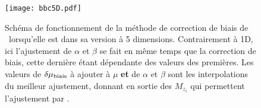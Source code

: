 \documentclass[../main/main.tex]{subfiles}
\begin{document}
\begin{figure}[]
    \centering
    \texttt{[image: bbc5D.pdf]}
    \caption[Schéma de fonctionnement de la méthode de correction de biais de
    \bbc5D]{Schéma de fonctionnement de la méthode de correction de biais de
        \bbc\ lorsqu'elle est dans sa version à 5 dimensions. Contrairement à
        \bbc1D, ici l'ajustement de $\alpha$ et $\beta$ se fait en même temps
        que la correction de biais, cette dernière étant dépendante des valeurs
        des premières. Les valeurs de $\delta\mu_{\rm biais}$ à ajouter à $\mu$
        \textbf{et} de $\alpha$ et $\beta$ sont les interpolations du meilleur
        ajustement, donnant en sortie des $M_{z_i}$ qui permettent l'ajustement
    par \wfit.}
    \label{fig:bbc5d}
\end{figure}

% 
% 
\end{document}
